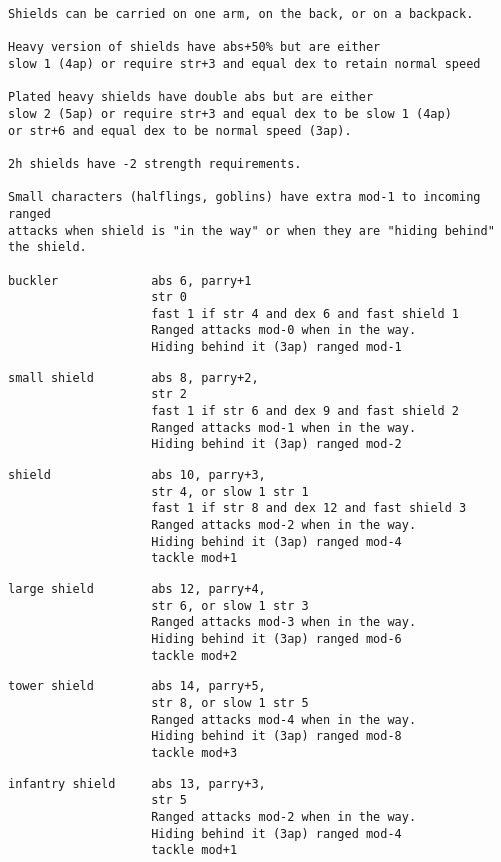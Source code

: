 \small \begin{samepage} \begin{verbatim}
Shields can be carried on one arm, on the back, or on a backpack.

Heavy version of shields have abs+50% but are either
slow 1 (4ap) or require str+3 and equal dex to retain normal speed

Plated heavy shields have double abs but are either
slow 2 (5ap) or require str+3 and equal dex to be slow 1 (4ap)
or str+6 and equal dex to be normal speed (3ap).

2h shields have -2 strength requirements.

Small characters (halflings, goblins) have extra mod-1 to incoming ranged
attacks when shield is "in the way" or when they are "hiding behind"
the shield.

buckler             abs 6, parry+1
                    str 0
                    fast 1 if str 4 and dex 6 and fast shield 1
                    Ranged attacks mod-0 when in the way.
                    Hiding behind it (3ap) ranged mod-1
\end{verbatim} \blocklistgap \begin{verbatim}
small shield        abs 8, parry+2,
                    str 2
                    fast 1 if str 6 and dex 9 and fast shield 2
                    Ranged attacks mod-1 when in the way.
                    Hiding behind it (3ap) ranged mod-2
\end{verbatim} \blocklistgap \begin{verbatim}
shield              abs 10, parry+3,
                    str 4, or slow 1 str 1
                    fast 1 if str 8 and dex 12 and fast shield 3
                    Ranged attacks mod-2 when in the way.
                    Hiding behind it (3ap) ranged mod-4
                    tackle mod+1
\end{verbatim} \blocklistgap \begin{verbatim}
large shield        abs 12, parry+4,
                    str 6, or slow 1 str 3
                    Ranged attacks mod-3 when in the way.
                    Hiding behind it (3ap) ranged mod-6
                    tackle mod+2
\end{verbatim} \blocklistgap \begin{verbatim}
tower shield        abs 14, parry+5,
                    str 8, or slow 1 str 5
                    Ranged attacks mod-4 when in the way.
                    Hiding behind it (3ap) ranged mod-8
                    tackle mod+3
\end{verbatim} \blocklistgap \begin{verbatim}
infantry shield     abs 13, parry+3,
                    str 5
                    Ranged attacks mod-2 when in the way.
                    Hiding behind it (3ap) ranged mod-4
                    tackle mod+1
\end{verbatim} \end{samepage} \normalsize \goodbreak

